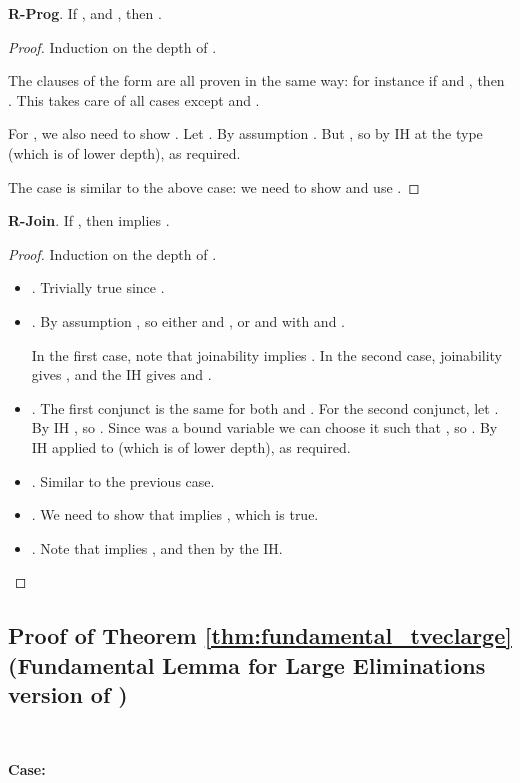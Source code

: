 \documentclass[copyright]{eptcs}
\begin{document}
\noindent \textbf{R-Prog}. If , and , then .

\begin{proof}
Induction on the depth of .

The clauses of the form  are all proven in the same way: for instance if  and , then . This takes care of all cases except  and .

For , we also need to show . Let . By assumption . But , so by IH at the type  (which is of lower depth),  as required.

The case  is similar to the above case: we need to show  and use .

\end{proof}

\noindent \textbf{R-Join}. If , then  
implies .

\begin{proof}
Induction on the  depth of . 
\begin{itemize}
\item . Trivially true since .
\item .  By assumption , so either  and
  , or  and
   with  and
  .

In the first case, note that joinability implies .
In the second case, joinability gives ,
and the IH gives  and .

\item . The first conjunct is the same for both  and .
For the second conjunct, let . By IH ,
so . Since  was a bound variable we can choose it such
that ,
so . By IH applied to  (which is of lower depth),
 as required.

\item . Similar to the previous case.

\item . We need to show that  implies , which is true.

\item . Note that  implies , and then by the IH.
\end{itemize}
\end{proof}

\subsection{Proof of Theorem \ref{thm:fundamental_tveclarge} (Fundamental Lemma for Large Eliminations version of )}

\ 

\noindent \textbf{Case:}

\
\end{document}
